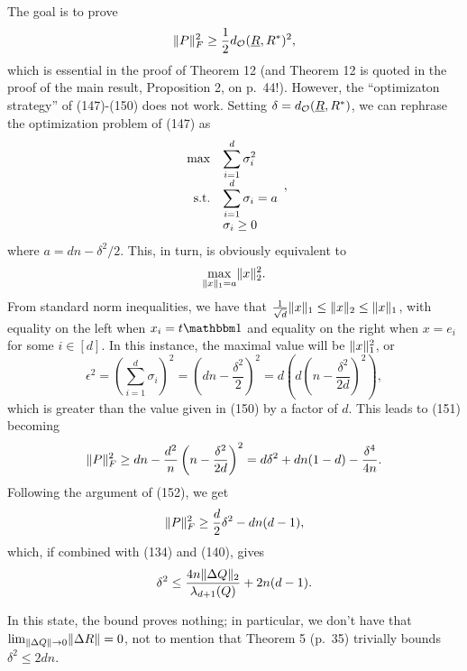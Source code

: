 The goal is to prove \begin{equation} \lVert P\rVert_F^2 \ge \frac{1}{2} d_{\mathcal{O}}(\underline{R}, R^*)^2, \label{goal} \end{equation} which is essential in the proof of Theorem 12 (and Theorem 12 is quoted in the proof of the main result, Proposition 2, on p.~44!).  However, the ``optimizaton strategy'' of (147)-(150) does not work.  Setting $\delta = d_{\mathcal{O}}(\underline{R}, R^*)$, we can rephrase the optimization problem of (147) as
\[\begin{array}{r>{\displaystyle}l}
\max & \sum_{i = 1}^d \sigma_i^2 \\
\text{s.t.} & \sum_{i = 1}^d \sigma_i = a \\
& \sigma_i \ge 0
\end{array},
\]
where $a = dn - \delta^2 / 2$.  This, in turn, is obviously equivalent to \[\max_{\lVert x\rVert_1 = a} \lVert x\rVert_2^2.\]  From standard norm inequalities, we have that $\frac{1}{\sqrt{d}} \lVert x\rVert_1 \le \lVert x\rVert_2 \le \lVert x\rVert_1$, with equality on the left when $x_i = t \one$ and equality on the right when $x = e_i$ for some $i \in [d]$.  In this instance, the maximal value will be $\lVert x\rVert_1^2$, or \[\epsilon^2 = \left(\sum_{i = 1}^d \sigma_i\right)^2 = \left(dn - \frac{\delta^2}{2}\right)^2 = d \left(d\left(n - \frac{\delta^2}{2d}\right)^2\right),\] which is greater than the value given in (150) by a factor of $d$.  This leads to (151) becoming \[\lVert P\rVert_F^2 \ge dn - \frac{d^2}{n}\left(n - \frac{\delta^2}{2d}\right)^2 = d \delta^2 + dn(1 - d) - \frac{\delta^4}{4n}.\]  Following the argument of (152), we get \[\lVert P\rVert_F^2 \ge \frac{d}{2} \delta^2 - dn(d - 1),\] which, if combined with (134) and (140), gives \[\delta^2 \le \frac{4n \lVert\Delta Q\rVert_2}{\lambda_{d + 1}(Q)} + 2n(d - 1).\]  

In this state, the bound proves nothing; in particular, we don't have that $\lim_{\lVert\Delta Q\rVert \to 0} \lVert\Delta R\rVert = 0$, not to mention that Theorem 5 (p.~35) trivially bounds $\delta^2 \le 2dn$.

